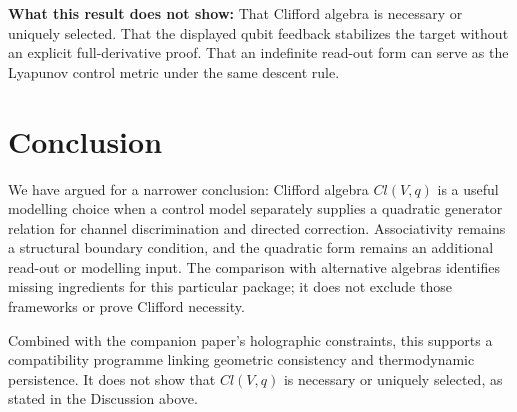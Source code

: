 \documentclass[aps,pre,onecolumn,superscriptaddress,floatfix,longbibliography]{revtex4-2}
\begin{document}
\textbf{What this result does not show:}
That Clifford algebra is necessary or uniquely selected.
That the displayed qubit feedback stabilizes the target without an explicit full-derivative proof.
That an indefinite read-out form can serve as the Lyapunov control metric under the same descent rule.

\section{Conclusion}

We have argued for a narrower conclusion: Clifford algebra $Cl(V,q)$ is
a useful modelling choice when a control model separately supplies a
quadratic generator relation for channel discrimination and directed
correction.  Associativity remains a structural boundary condition, and
the quadratic form remains an additional read-out or modelling input.
The comparison with alternative algebras identifies missing ingredients
for this particular package; it does not exclude those frameworks or
prove Clifford necessity.

Combined with the companion paper's holographic constraints, this
supports a compatibility programme linking geometric consistency and
thermodynamic persistence.  It does not show that $Cl(V,q)$ is necessary
or uniquely selected, as stated in the Discussion above.
\end{document}
